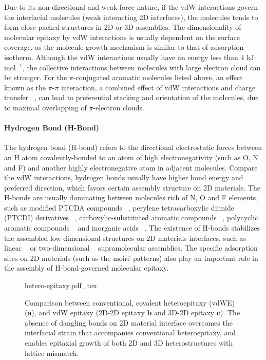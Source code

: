 Due to its non-directional and weak force nature, if the vdW
interactions govern the interfacial molecules (weak interacting 2D
interfaces), the molecules tends to form close-packed structures in 2D
or 3D assemblies. The dimensionality of molecular epitaxy by vdW
interactions is usually dependent on the surface coverage, as the
molecule growth mechanism is similar to that of adsorption
isotherm. Although the vdW interactions usually have an energy less than
4 kJ\(\cdot\)mol\(^{-1}\), the collective interactions between molecules
with large electron cloud can be stronger. For the \(\pi\)-conjugated
aromatic molecules listed above, an effect known as the \(\pi\)-\(\pi\)
interaction, a combined effect of vdW interactions and charge
transfer ~\cite{Hunter_1990_pi}, can lead to preferential stacking and
orientation of the molecules, due to maximal overlapping of
\(\pi\)-electron clouds. 


\paragraph{Hydrogen Bond (H-Bond)}

The hydrogen bond (H-bond) refers to the directional electrostatic
forces between an H atom covalently-bonded to an atom of high
electro\-negativity (such as O, N and F) and another highly
electro\-negative atom in adjacent molecules. Compare the vdW
interactions, hydrogen bonds usually have higher bond energy and
preferred direction, which favors certain assembly structure on 2D
materials. The H-bonds are usually dominating between molecules rich
of N, O and F elements, such as modified PTCDA compounds
~\cite{Mura_2010_DFT_H_bond_PTCDA_gr,Karmel_2014_assembl_hetero_gr},
perylene tetra\-carboxylic diimide (PTCDI) derivatives
~\cite{Pollard_2010_hbond_assembly_gr,Karmel_2014_PTCDI_gr},
carboxylic-substituted aromatic compounds
~\cite{Rochefort_2009_aro_graphene_mech,Addou_2013_TPA_gr}, polycyclic
aromatic compounds
~\cite{Kozlov_2012_polyaro_gr,Roos_2011_BTP_gr,Meier_2010_polycyclic_gr}
and inorganic acids ~\cite{Prado_2011_2D_acid_gr}. The existence of
H-bonds stabilizes the assembled low-dimensional structures on 2D
materials interfaces, such as linear
~\cite{Pollard_2010_hbond_assembly_gr} or two-dimensional
~\cite{Prado_2011_2D_acid_gr} supra\-molecular assemblies. The specific
adsorption sites on 2D materials (such as the moiré patterns) also
play an important role in the assembly of H-bond-governed molecular
epitaxy.

\begin{figure}[h]
  \centering
  {hetero-epitaxy.pdf_tex}
  \caption{\label{fig:intro-hetero} %
    Comparison between conventional, covalent hetero\-epitaxy (vdWE)
    (\textbf{a}), and vdW epitaxy (2D-2D epitaxy \textbf{b} and 3D-2D
    epitaxy \textbf{c}). The absence of dangling bonds on 2D material
    interface overcomes the interfacial strain that accompanies
    conventional hetero\-epitaxy, and enables epitaxial growth of both
    2D and 3D heterostructures with lattice mismatch.%
  }
\end{figure}


